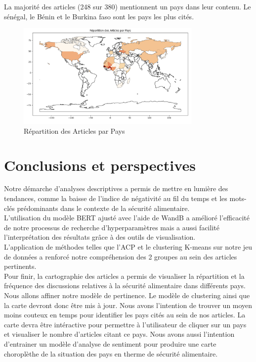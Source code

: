 \documentclass{article}
\begin{document}
La majorité des articles (248 sur 380) mentionnent un pays dans leur contenu. Le sénégal, le Bénin et le Burkina faso sont les pays les plus cités. 

\begin{figure}[!htbp]
    \centering
    \includegraphics[width=0.8\textwidth]{carte2.png}
    \caption{Répartition des Articles par Pays}
    \label{fig: Répartition des Articles par Pays}
\end{figure}

\section{Conclusions et perspectives}

Notre démarche d'analyses descriptives a permis de mettre en lumière des tendances, comme la baisse de l'indice de négativité au fil du temps et les mots-clés prédominants dans le contexte de la sécurité alimentaire. \\

L'utilisation du modèle BERT ajusté avec l'aide de WandB a amélioré l'efficacité de notre processus de recherche d'hyperparamètres mais a aussi facilité l'interprétation des résultats grâce à des outils de visualisation. \\

L'application de méthodes telles que l'ACP et le clustering K-means sur notre jeu de données a renforcé notre compréhension des 2 groupes au sein des articles pertinents. \\

Pour finir, la cartographie des articles a permis de visualiser la répartition et la fréquence des discussions relatives à la sécurité alimentaire dans différents pays. \\

Nous allons affiner notre modèle de pertinence. Le modèle de clustering ainsi que la carte devront donc être mis à jour. Nous avons l'intention de trouver un moyen moins couteux en temps pour identifier les pays cités au sein de nos articles. La carte devra être intéractive pour permettre à l'utilisateur de cliquer sur un pays et visualiser le nombre d'articles citant ce pays. Nous avons aussi l'intention d'entrainer un modèle d'analyse de sentiment pour produire une carte choroplèthe de la situation des pays en therme de sécurité alimentaire. 
\end{document}
